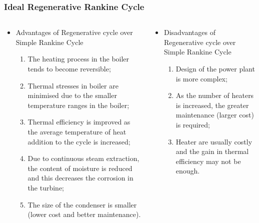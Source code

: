 \documentclass[10pt,compress]{beamer}
\begin{document}
\begin{frame}
 \frametitle{Ideal Regenerative Rankine Cycle}
  \begin{columns}
   \begin{column}[c]{0.5\linewidth}
    \begin{itemize}
     \item <1-> Advantages of Regenerative cycle over Simple Rankine Cycle
     \begin{enumerate} %
      \item <2-> The heating process in the boiler tends to become reversible;
      \item <3-> Thermal stresses in boiler are minimised due to the smaller temperature ranges in the boiler;
      \item <4-> Thermal efficiency is improved as the average temperature of heat addition to the cycle is increased;
      \item <5-> Due to continuous steam extraction, the content of moisture is reduced and this decreases the corrosion in the turbine;
      \item<6-> The size of the condenser is smaller (lower cost and better maintenance).
     \end{enumerate}
    \end{itemize} 
   \end{column}

   \begin{column}[c]{0.5\linewidth}  
    \begin{itemize}
     \item <7-> Disadvantages of Regenerative cycle over Simple Rankine Cycle
     \begin{enumerate} %
      \item <8-> Design of the power plant is more complex;
      \item <9-> As the number of heaters is increased, the greater maintenance (larger cost) is required;
      \item <10-> Heater are usually costly and the gain in thermal efficiency may not be enough. 
     \end{enumerate}
    \end{itemize} 
   \end{column}
  \end{columns}
  
\end{frame}
\end{document}
